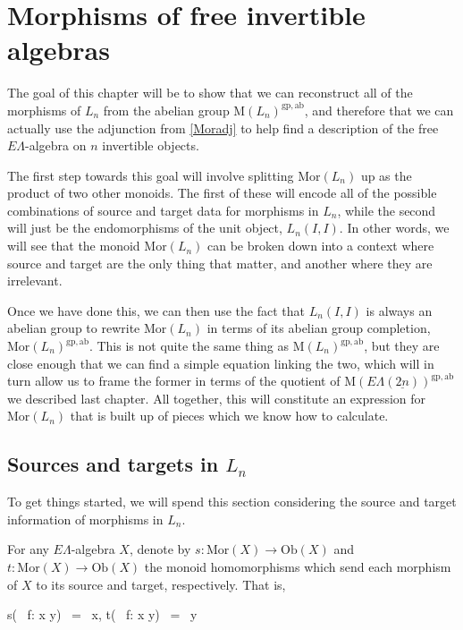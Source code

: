 \documentclass{amsbook} %
\newcommand{\ELnn}{E\Lambda(\underline{2n})}
\newenvironment{eq*}{\begin{equation*}}{\end{equation*}}
\numberwithin{section}{chapter}
\begin{document}
\chapter{Morphisms of free invertible algebras}
\label{morphisms}
 
The goal of this chapter will be to show that we can reconstruct all of the morphisms of $L_n$ from the abelian group $\mathrm{M}(L_n)^{\mathrm{gp, ab}}$, and therefore that we can actually use the adjunction from \cref{Moradj} to help find a description of the free $E\Lambda$-algebra on $n$ invertible objects. 

The first step towards this goal will involve splitting $\mathrm{Mor}(L_n)$ up as the product of two other monoids. The first of these will encode all of the possible combinations of source and target data for morphisms in $L_n$, while the second will just be the endomorphisms of the unit object, $L_n(I, I)$. In other words, we will see that the monoid $\mathrm{Mor}(L_n)$ can be broken down into a context where source and target are the only thing that matter, and another where they are irrelevant. 

Once we have done this, we can then use the fact that $L_n(I, I)$ is always an abelian group to rewrite $\mathrm{Mor}(L_n)$ in terms of its abelian group completion, $\mathrm{Mor}(L_n)^{\mathrm{gp, ab}}$. This is not quite the same thing as $\mathrm{M}(L_n)^{\mathrm{gp, ab}}$, but they are close enough that we can find a simple equation linking the two, which will in turn allow us to frame the former in terms of the quotient of $\mathrm{M}(\ELnn)^{\mathrm{gp, ab}}$ we described last chapter. All together, this will constitute an expression for $\mathrm{Mor}(L_n)$ that is built up of pieces which we know how to calculate.

\section{Sources and targets in \texorpdfstring{$L_n$}{L_n}}   

To get things started, we will spend this section considering the source and target information of morphisms in $L_n$. 

\begin{Defi}\label{st} For any $E\Lambda$-algebra $X$, denote by $s: \mathrm{Mor}(X) \to \mathrm{Ob}(X)$ and $t: \mathrm{Mor}(X) \to \mathrm{Ob}(X)$ the monoid homomorphisms which send each morphism of $X$ to its source and target, respectively. That is,
\begin{eq*} s( \, f: x \to y) \, = \, x, \quad \quad t( \, f: x \to y) \, = \, y \end{eq*}
\end{Defi}
\end{document}
